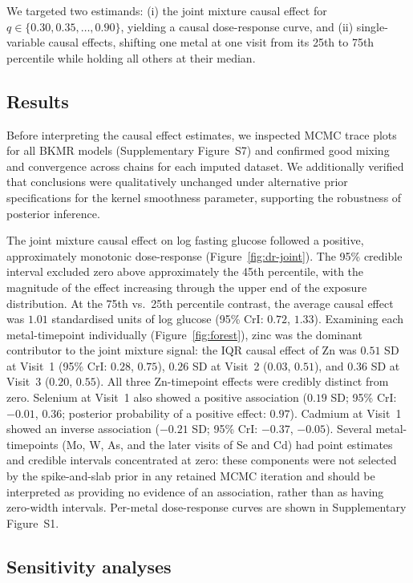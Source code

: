 We targeted two estimands: (i) the joint mixture causal effect for $q \in \{0.30, 0.35, \ldots, 0.90\}$, yielding a causal dose-response curve, and (ii) single-variable causal effects, shifting one metal at one visit from its 25th to 75th percentile while holding all others at their median.

\subsection*{Results}

Before interpreting the causal effect estimates, we inspected MCMC trace plots for all BKMR models (Supplementary Figure~S7) and confirmed good mixing and convergence across chains for each imputed dataset. We additionally verified that conclusions were qualitatively unchanged under alternative prior specifications for the kernel smoothness parameter, supporting the robustness of posterior inference.

The joint mixture causal effect on log fasting glucose followed a positive, approximately monotonic dose-response (Figure~\ref{fig:dr-joint}). The 95\% credible interval excluded zero above approximately the 45th percentile, with the magnitude of the effect increasing through the upper end of the exposure distribution. At the 75th vs.\ 25th percentile contrast, the average causal effect was $1.01$ standardised units of log glucose (95\% CrI: $0.72$, $1.33$). Examining each metal-timepoint individually (Figure~\ref{fig:forest}), zinc was the dominant contributor to the joint mixture signal: the IQR causal effect of Zn was $0.51$ SD at Visit~1 (95\% CrI: $0.28$, $0.75$), $0.26$ SD at Visit~2 ($0.03$, $0.51$), and $0.36$ SD at Visit~3 ($0.20$, $0.55$). All three Zn-timepoint effects were credibly distinct from zero. Selenium at Visit~1 also showed a positive association ($0.19$ SD; 95\% CrI: $-0.01$, $0.36$; posterior probability of a positive effect: $0.97$). Cadmium at Visit~1 showed an inverse association ($-0.21$ SD; 95\% CrI: $-0.37$, $-0.05$). Several metal-timepoints (Mo, W, As, and the later visits of Se and Cd) had point estimates and credible intervals concentrated at zero: these components were not selected by the spike-and-slab prior in any retained MCMC iteration and should be interpreted as providing no evidence of an association, rather than as having zero-width intervals. Per-metal dose-response curves are shown in Supplementary Figure~S1.

\subsection*{Sensitivity analyses}

